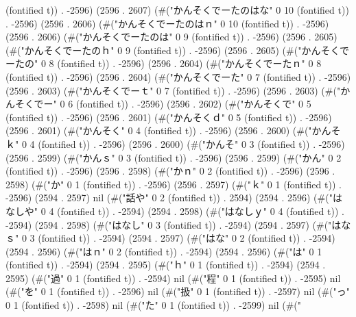 (fontified t)) . -2596) (2596 . 2607) (#("かんそくでーたのはな" 0 10 (fontified t)) . -2596) (2596 . 2606) (#("かんそくでーたのはｎ" 0 10 (fontified t)) . -2596) (2596 . 2606) (#("かんそくでーたのは" 0 9 (fontified t)) . -2596) (2596 . 2605) (#("かんそくでーたのｈ" 0 9 (fontified t)) . -2596) (2596 . 2605) (#("かんそくでーたの" 0 8 (fontified t)) . -2596) (2596 . 2604) (#("かんそくでーたｎ" 0 8 (fontified t)) . -2596) (2596 . 2604) (#("かんそくでーた" 0 7 (fontified t)) . -2596) (2596 . 2603) (#("かんそくでーｔ" 0 7 (fontified t)) . -2596) (2596 . 2603) (#("かんそくでー" 0 6 (fontified t)) . -2596) (2596 . 2602) (#("かんそくで" 0 5 (fontified t)) . -2596) (2596 . 2601) (#("かんそくｄ" 0 5 (fontified t)) . -2596) (2596 . 2601) (#("かんそく" 0 4 (fontified t)) . -2596) (2596 . 2600) (#("かんそｋ" 0 4 (fontified t)) . -2596) (2596 . 2600) (#("かんそ" 0 3 (fontified t)) . -2596) (2596 . 2599) (#("かんｓ" 0 3 (fontified t)) . -2596) (2596 . 2599) (#("かん" 0 2 (fontified t)) . -2596) (2596 . 2598) (#("かｎ" 0 2 (fontified t)) . -2596) (2596 . 2598) (#("か" 0 1 (fontified t)) . -2596) (2596 . 2597) (#("ｋ" 0 1 (fontified t)) . -2596) (2594 . 2597) nil (#("話や" 0 2 (fontified t)) . 2594) (2594 . 2596) (#("はなしや" 0 4 (fontified t)) . -2594) (2594 . 2598) (#("はなしｙ" 0 4 (fontified t)) . -2594) (2594 . 2598) (#("はなし" 0 3 (fontified t)) . -2594) (2594 . 2597) (#("はなｓ" 0 3 (fontified t)) . -2594) (2594 . 2597) (#("はな" 0 2 (fontified t)) . -2594) (2594 . 2596) (#("はｎ" 0 2 (fontified t)) . -2594) (2594 . 2596) (#("は" 0 1 (fontified t)) . -2594) (2594 . 2595) (#("ｈ" 0 1 (fontified t)) . -2594) (2594 . 2595) (#("過" 0 1 (fontified t)) . -2594) nil (#("程" 0 1 (fontified t)) . -2595) nil (#("を" 0 1 (fontified t)) . -2596) nil (#("扱" 0 1 (fontified t)) . -2597) nil (#("っ" 0 1 (fontified t)) . -2598) nil (#("た" 0 1 (fontified t)) . -2599) nil (#("

